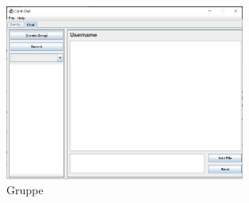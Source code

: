 \begin{figure}
    \centering
    \includegraphics[width=0.7\textwidth]{gfx/Gruppe.png}
    \caption{Gruppe}
    \label{fig:Gruppe}
\end{figure}
